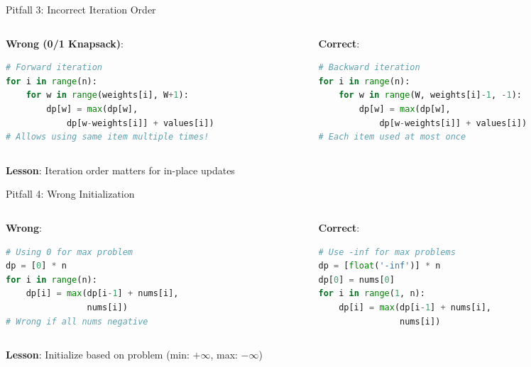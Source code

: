 \documentclass[aspectratio=169]{beamer}
\begin{document}
\begin{frame}[fragile]{Pitfall 3: Incorrect Iteration Order}
\begin{columns}
\begin{column}{0.48\textwidth}
\textbf{Wrong (0/1 Knapsack)}:
\begin{lstlisting}[language=Python, basicstyle=\ttfamily\tiny]
# Forward iteration
for i in range(n):
    for w in range(weights[i], W+1):
        dp[w] = max(dp[w],
            dp[w-weights[i]] + values[i])
# Allows using same item multiple times!
\end{lstlisting}
\end{column}

\begin{column}{0.48\textwidth}
\textbf{Correct}:
\begin{lstlisting}[language=Python, basicstyle=\ttfamily\tiny]
# Backward iteration
for i in range(n):
    for w in range(W, weights[i]-1, -1):
        dp[w] = max(dp[w],
            dp[w-weights[i]] + values[i])
# Each item used at most once
\end{lstlisting}
\end{column}
\end{columns}

\vspace{0.5cm}

\textbf{Lesson}: Iteration order matters for in-place updates
\end{frame}

\begin{frame}[fragile]{Pitfall 4: Wrong Initialization}
\begin{columns}
\begin{column}{0.48\textwidth}
\textbf{Wrong}:
\begin{lstlisting}[language=Python, basicstyle=\ttfamily\tiny]
# Using 0 for max problem
dp = [0] * n
for i in range(n):
    dp[i] = max(dp[i-1] + nums[i],
                nums[i])
# Wrong if all nums negative
\end{lstlisting}
\end{column}

\begin{column}{0.48\textwidth}
\textbf{Correct}:
\begin{lstlisting}[language=Python, basicstyle=\ttfamily\tiny]
# Use -inf for max problems
dp = [float('-inf')] * n
dp[0] = nums[0]
for i in range(1, n):
    dp[i] = max(dp[i-1] + nums[i],
                nums[i])
\end{lstlisting}
\end{column}
\end{columns}

\vspace{0.5cm}

\textbf{Lesson}: Initialize based on problem (min: $+\infty$, max: $-\infty$)
\end{frame}
\end{document}
